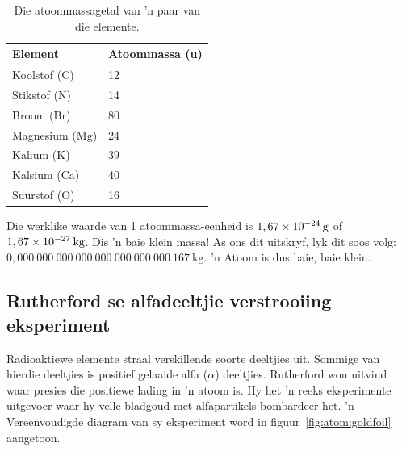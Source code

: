           \begin{table}[H]
        \begin{center}
      \label{m38756*uid8}
    \noindent
      \begin{tabular}{|l|l|}\hline
                  \textbf{Element}
                 &
                  \textbf{Atoommassa (u)}
                \\ \hline
        Koolstof ($\text{C}$) &
        12 \\ \hline
        Stikstof ($\text{N}$) &
        14 \\ \hline
        Broom ($\text{Br}$) &
        80 \\ \hline
        Magnesium ($\text{Mg}$) &
        24 \\ \hline
        Kalium ($\text{K}$) &
        39 \\ \hline
        Kalsium ($\text{Ca}$) &
        40 \\ \hline
        Suurstof ($\text{O}$) &
        16 \\ \hline
    \end{tabular}
      \end{center}
    \caption{Die atoommassagetal van  'n paar van die elemente.}
\label{tab:atomic mass}
\end{table}
    \par
        \label{m38756*id255096}
Die werklike waarde van 1 atoommassa-eenheid is $1,67\ensuremath{\times}{10}^{-24}\phantom{\rule{2pt}{0ex}}\text{g}$ of $1,67\ensuremath{\times}{10}^{-27}\phantom{\rule{2pt}{0ex}}\text{kg}$. Dis  'n baie klein massa! As ons dit uitskryf, lyk dit soos volg: $0,000~000~000~000~000~000~000~000~167~\text{kg}$.  'n Atoom is dus baie, baie klein.\par 
\label{m38756*eip-320}
            \subsection*{Rutherford se alfadeeltjie verstrooiing eksperiment}
            \nopagebreak
            \label{m38756*id254668}
Radioaktiewe elemente straal verskillende soorte deeltjies uit. Sommige van hierdie deeltjies is positief gelaaide alfa ($\alpha $) deeltjies. Rutherford wou uitvind waar presies die positiewe lading in  'n atoom is. Hy het   'n reeks eksperimente uitgevoer waar hy velle bladgoud met alfapartikels bombardeer het.   'n Vereenvoudigde diagram van sy eksperiment word in figuur~\ref{fig:atom:goldfoil} aangetoon.\par 

